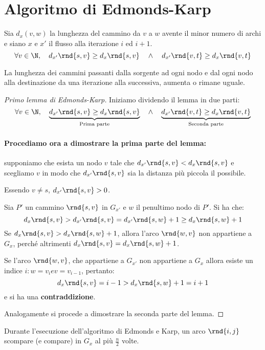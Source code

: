 \documentclass[\main/main.tex]{subfiles}
\begin{document}
\section{Algoritmo di Edmonds-Karp}
\begin{lemma}\label{first_lemma_karp}
  Sia \(d_x(v,w)\) la lunghezza del cammino da \(v\) a \(w\) avente il minor numero di archi e siano \(x\) e \(x'\) il flusso alla iterazione \(i\) ed \(i+1\).
  \[
    \forall v \in \N, \quad d_{x'}\rnd{s, v} \geq d_{x}\rnd{s, v} \quad \land \quad d_{x'}\rnd{v, t} \geq d_{x}\rnd{v, t}
  \]

  La lunghezza dei cammini passanti dalla sorgente ad ogni nodo e dal ogni nodo alla destinazione da una iterazione alla successiva, aumenta o rimane uguale.
\end{lemma}
\begin{proof}[Primo lemma di Edmonds-Karp]
  Iniziamo dividendo il lemma in due parti:
  \[
    \forall v \in \N, \quad \underbrace{d_{x'}\rnd{s, v} \geq d_{x}\rnd{s, v}}_{\text{Prima parte}} \quad \land \quad \underbrace{d_{x'}\rnd{v, t} \geq d_{x}\rnd{v, t}}_{\text{Seconda parte}}
  \]
  \paragraph*{Procediamo ora a dimostrare la prima parte del lemma:} supponiamo che esista un nodo \(v\) tale che \(d_{x'}\rnd{s, v} < d_x\rnd{s, v}\) e scegliamo \(v\) in modo che \(d_{x'}\rnd{s, v}\) sia la distanza più piccola il possibile.

  Essendo \(v \neq s\), \(d_{x'}\rnd{s, v} > 0\).

  Sia \(P'\) un cammino \(\rnd{s, v}\) in \(G_{x'}\) e \(w\) il penultimo nodo di \(P'\). Si ha che:
  \[
    d_{x}\rnd{s, v} > d_{x'}\rnd{s, v} = d_{x'}\rnd{s, w} + 1 \geq d_{x}\rnd{s, w} + 1
  \]
  Se \(d_{x}\rnd{s, v} > d_{x}\rnd{s, w} + 1\), allora l'arco \(\rnd{w, v}\) non appartiene a \(G_x\), perché altrimenti \(d_x\rnd{s, v} = d_x\rnd{s, w}+1\).

  Se l'arco \(\rnd{w, v}\), che appartiene a \(G_{x'}\) non appartiene a \(G_x\) allora esiste un indice \(i: w = v_ i e v = v_{i-1}\), pertanto:
  \[
    d_{x}\rnd{s, v} = i -1 > d_{x}\rnd{s, w} + 1 = i+1
  \]
  e si ha una \textbf{contraddizione}.

  Analogamente si procede a dimostrare la seconda parte del lemma.
\end{proof}
\begin{lemma}\label{second_lemma_karp}
  Durante l'esecuzione dell'algoritmo di Edmonds e Karp, un arco \(\rnd{i,j}\) scompare (e compare) in \(G_{x}\) al più \(\frac{n}{2}\) volte.
\end{lemma}
\end{document}
